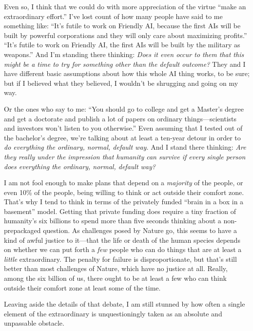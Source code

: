 {
 Even so, I think that we could do with more appreciation of the
virtue ``make an extraordinary
effort.'' I've lost count of how many
people have said to me something like:
``It's futile to work on Friendly AI,
because the first AIs will be built by powerful corporations and they
will only care about maximizing profits.''
``It's futile to work on Friendly AI,
the first AIs will be built by the military as
weapons.'' And I'm standing there
thinking: \textit{Does it even occur to them that this might be a time
to try for something other than the default outcome?} They and I have
different basic assumptions about how this whole AI thing works, to be
sure; but if I believed what they believed, I wouldn't
be shrugging and going on my way.}

{
 Or the ones who say to me: ``You should go to
college and get a Master's degree and get a doctorate
and publish a lot of papers on ordinary things---scientists and
investors won't listen to you
otherwise.'' Even assuming that I tested out of the
bachelor's degree, we're talking about
at least a ten-year detour in order to \textit{do everything the
ordinary, normal, default way.} And I stand there thinking: \textit{Are
they really under the impression that humanity can survive if every
single person does everything the ordinary, normal, default way?}}

{
 I am not fool enough to make plans that depend on a
\textit{majority} of the people, or even 10\% of the people, being
willing to think or act outside their comfort zone.
That's why I tend to think in terms of the privately
funded ``brain in a box in a
basement'' model. Getting that private funding does
require a tiny fraction of humanity's six billions to
spend more than five seconds thinking about a non-prepackaged question.
As challenges posed by Nature go, this seems to have a kind of awful
justice to it---that the life or death of the human species depends on
whether we can put forth a \textit{few} people who can do things that
are at least a \textit{little} extraordinary. The penalty for failure
is disproportionate, but that's still better than most
challenges of Nature, which have no justice at all. Really, among the
six billion of us, there ought to be at least a few who can think
outside their comfort zone at least some of the time.}

{
 Leaving aside the details of that debate, I am still stunned by
how often a single element of the extraordinary is unquestioningly
taken as an absolute and unpassable obstacle.}

